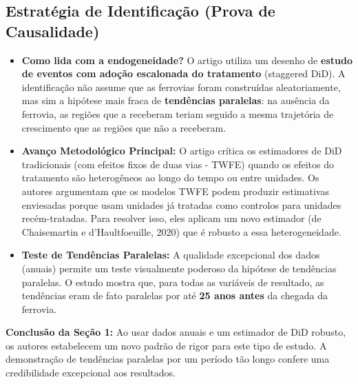 \documentclass[12pt, a4paper]{article}
\begin{document}
\subsection{Estratégia de Identificação (Prova de Causalidade)}

\begin{itemize}
    \item \textbf{Como lida com a endogeneidade?} O artigo utiliza um desenho de \textbf{estudo de eventos com adoção escalonada do tratamento} (staggered DiD). A identificação não assume que as ferrovias foram construídas aleatoriamente, mas sim a hipótese mais fraca de \textbf{tendências paralelas}: na ausência da ferrovia, as regiões que a receberam teriam seguido a mesma trajetória de crescimento que as regiões que não a receberam.

    \item \textbf{Avanço Metodológico Principal:} O artigo crítica os estimadores de DiD tradicionais (com efeitos fixos de duas vias - TWFE) quando os efeitos do tratamento são heterogêneos ao longo do tempo ou entre unidades. Os autores argumentam que os modelos TWFE podem produzir estimativas enviesadas porque usam unidades já tratadas como controlos para unidades recém-tratadas. Para resolver isso, eles aplicam um novo estimador (de Chaisemartin e d'Haultfoeuille, 2020) que é robusto a essa heterogeneidade.

    \item \textbf{Teste de Tendências Paralelas:} A qualidade excepcional dos dados (anuais) permite um teste visualmente poderoso da hipótese de tendências paralelas. O estudo mostra que, para todas as variáveis de resultado, as tendências eram de fato paralelas por até \textbf{25 anos antes} da chegada da ferrovia.
    
\end{itemize}

\noindent\textbf{Conclusão da Seção 1:} Ao usar dados anuais e um estimador de DiD robusto, os autores estabelecem um novo padrão de rigor para este tipo de estudo. A demonstração de tendências paralelas por um período tão longo confere uma credibilidade excepcional aos resultados.
\end{document}
